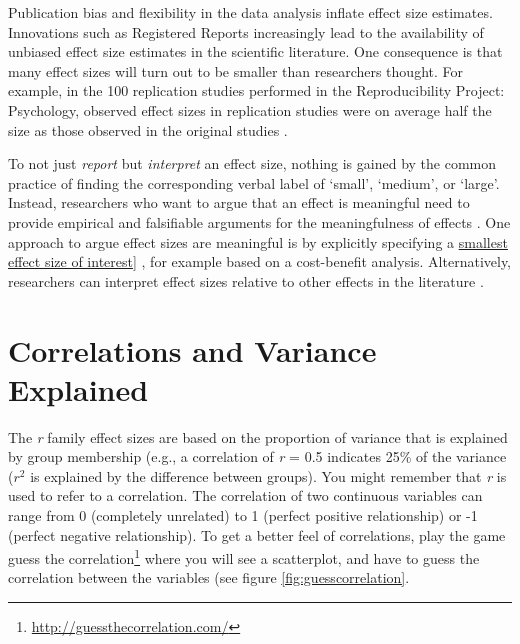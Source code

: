 \documentclass[
  oneside]{krantz}
\renewcommand{\href}[2]{#2\footnote{\url{#1}}}
\begin{document}
Publication bias and flexibility in the data analysis inflate effect size estimates. Innovations such as Registered Reports \citep{chambers_past_2022, nosek_registered_2014} increasingly lead to the availability of unbiased effect size estimates in the scientific literature. One consequence is that many effect sizes will turn out to be smaller than researchers thought. For example, in the 100 replication studies performed in the Reproducibility Project: Psychology, observed effect sizes in replication studies were on average half the size as those observed in the original studies \citep{open_science_collaboration_estimating_2015}.

To not just \emph{report} but \emph{interpret} an effect size, nothing is gained by the common practice of finding the corresponding verbal label of `small', `medium', or `large'. Instead, researchers who want to argue that an effect is meaningful need to provide empirical and falsifiable arguments for the meaningfulness of effects \citep{primbs_are_2022, anvari_not_2021}. One approach to argue effect sizes are meaningful is by explicitly specifying a \protect\hyperlink{sesoi}{smallest effect size of interest}{]} \citep{gotz_small_2022}, for example based on a cost-benefit analysis. Alternatively, researchers can interpret effect sizes relative to other effects in the literature \citep{baguley_standardized_2009, funder_evaluating_2019}.

\hypertarget{correlations-and-variance-explained}{%
\section{Correlations and Variance Explained}\label{correlations-and-variance-explained}}

The \emph{r} family effect sizes are based on the proportion of variance that is explained by group membership (e.g., a correlation of \emph{r} = 0.5 indicates 25\% of the variance (\(r^2\) is explained by the difference between groups). You might remember that \emph{r} is used to refer to a correlation. The correlation of two continuous variables can range from 0 (completely unrelated) to 1 (perfect positive relationship) or -1 (perfect negative relationship). To get a better feel of correlations, play the game \href{http://guessthecorrelation.com/}{guess the correlation} where you will see a scatterplot, and have to guess the correlation between the variables (see figure \ref{fig:guesscorrelation}.
\end{document}
